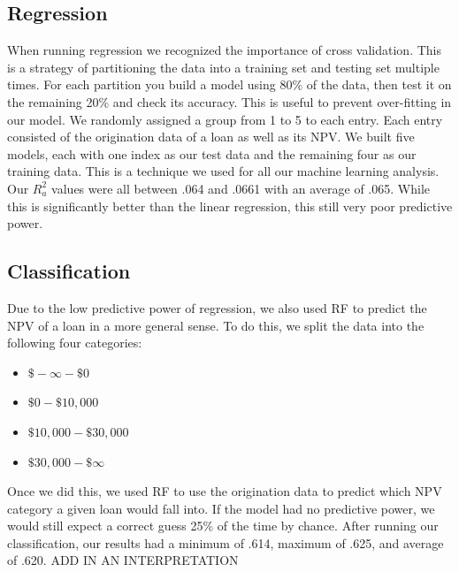 \documentclass[12 pt]{uncw_thesis}
\theoremstyle{plain}
\theoremstyle{remark}
\theoremstyle{definition}
\begin{document}
\subsection{Regression}
When running regression we recognized the importance of cross validation. This is a strategy of partitioning the data into a training set and testing set multiple times. For each partition you build a model using 80\% of the data, then test it on the remaining 20\% and check its accuracy. This is useful to prevent over-fitting in our model. We randomly assigned a group from 1 to 5 to each entry. Each entry consisted of the origination data of a loan as well as its NPV. We built five models, each with one index as our test data and the remaining four as our training data. This is a technique we used for all our machine learning analysis. Our \(R_a^2\) values were all between .064 and .0661 with an average of .065. While this is significantly better than the linear regression, this still very poor predictive power. 
\subsection{Classification}
Due to the low predictive power of regression, we also used RF to predict the NPV of a loan in a more general sense. To do this, we split the data into the following four categories: 
\begin{itemize}
	\item $\$-\infty - \$0$
	\item $\$0 - \$10,000$
	\item $\$10,000 - \$30,000$
	\item $\$30,000 - \$\infty$
\end{itemize}
Once we did this, we used RF to use the origination data to predict which NPV category a given loan would fall into. If the model had no predictive power, we would still expect a correct guess 25\% of the time by chance. After running our classification, our results had a minimum of .614, maximum of .625, and average of .620. ADD IN AN INTERPRETATION 
\end{document}

